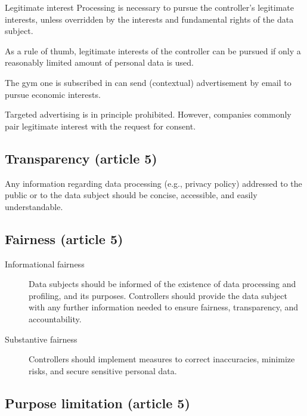 \begin{descriptionlist}
    \item[Legitimate interest]
        Processing is necessary to pursue the controller's legitimate interests, unless overridden by the interests and fundamental rights of the data subject.
    \begin{remark}
        As a rule of thumb, legitimate interests of the controller can be pursued if only a reasonably limited amount of personal data is used.
    \end{remark}
    \begin{example}
        The gym one is subscribed in can send (contextual) advertisement by email to pursue economic interests.
    \end{example}
    \begin{remark}
        Targeted advertising is in principle prohibited. However, companies commonly pair legitimate interest with the request for consent.
    \end{remark}
\end{descriptionlist}


\subsection{Transparency (article 5)} 

Any information regarding data processing (e.g., privacy policy) addressed to the public or to the data subject should be concise, accessible, and easily understandable.


\subsection{Fairness (article 5)}

\begin{description}
    \item[Informational fairness] 
        Data subjects should be informed of the existence of data processing and profiling, and its purposes. Controllers should provide the data subject with any further information needed to ensure fairness, transparency, and accountability.

    \item[Substantive fairness] 
        Controllers should implement measures to correct inaccuracies, minimize risks, and secure sensitive personal data.
\end{description}


\subsection{Purpose limitation (article 5)} 

